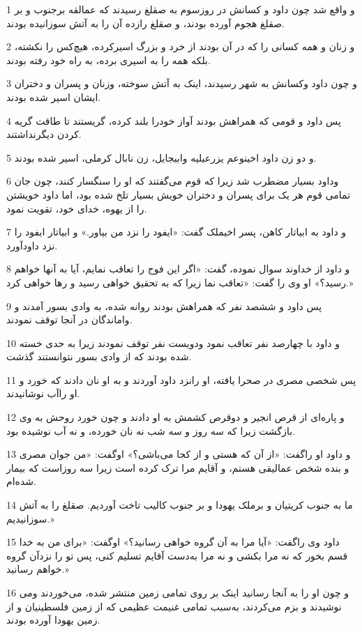 \par 1 و واقع شد چون داود و کسانش در روزسوم به صقلغ رسیدند که عمالقه برجنوب و بر صقلغ هجوم آورده بودند، و صقلغ رازده آن را به آتش سوزانیده بودند.
\par 2 و زنان و همه کسانی را که در آن بودند از خرد و بزرگ اسیرکرده، هیچ‌کس را نکشته، بلکه همه را به اسیری برده، به راه خود رفته بودند.
\par 3 و چون داود وکسانش به شهر رسیدند، اینک به آتش سوخته، وزنان و پسران و دختران ایشان اسیر شده بودند.
\par 4 پس داود و قومی که همراهش بودند آواز خودرا بلند کرده، گریستند تا طاقت گریه کردن دیگرنداشتند.
\par 5 و دو زن داود اخینوعم یزرعیلیه وابیجایل، زن نابال کرملی، اسیر شده بودند.
\par 6 وداود بسیار مضطرب شد زیرا که قوم می‌گفتند که او را سنگسار کنند، چون جان تمامی قوم هر یک برای پسران و دختران خویش بسیار تلخ شده بود، اما داود خویشتن را از یهوه، خدای خود، تقویت نمود.
\par 7 و داود به ابیاتار کاهن، پسر اخیملک گفت: «ایفود را نزد من بیاور.» و ابیاتار ایفود را نزد داودآورد.
\par 8 و داود از خداوند سوال نموده، گفت: «اگر این فوج را تعاقب نمایم، آیا به آنها خواهم رسید؟» او وی را گفت: «تعاقب نما زیرا که به تحقیق خواهی رسید و رها خواهی کرد.»
\par 9 پس داود و ششصد نفر که همراهش بودند روانه شده، به وادی بسور آمدند و واماندگان در آنجا توقف نمودند.
\par 10 و داود با چهارصد نفر تعاقب نمود ودویست نفر توقف نمودند زیرا به حدی خسته شده بودند که از وادی بسور نتوانستند گذشت.
\par 11 پس شخصی مصری در صحرا یافته، او رانزد داود آوردند و به او نان دادند که خورد و او راآب نوشانیدند.
\par 12 و پاره‌ای از قرص انجیر و دوقرص کشمش به او دادند و چون خورد روحش به وی بازگشت زیرا که سه روز و سه شب نه نان خورده، و نه آب نوشیده بود.
\par 13 و داود او راگفت: «از آن که هستی و از کجا می‌باشی؟» اوگفت: «من جوان مصری و بنده شخص عمالیقی هستم، و آقایم مرا ترک کرده است زیرا سه روزاست که بیمار شده‌ام.
\par 14 ما به جنوب کریتیان و برملک یهودا و بر جنوب کالیب تاخت آوردیم. صقلغ را به آتش سوزانیدیم.»
\par 15 داود وی راگفت: «آیا مرا به آن گروه خواهی رسانید؟» اوگفت: «برای من به خدا قسم بخور که نه مرا بکشی و نه مرا به‌دست آقایم تسلیم کنی، پس تو را نزدآن گروه خواهم رسانید.»
\par 16 و چون او را به آنجا رسانید اینک بر روی تمامی زمین منتشر شده، می‌خوردند ومی نوشیدند و بزم می‌کردند، به‌سبب تمامی غنیمت عظیمی که از زمین فلسطینیان و از زمین یهودا آورده بودند.
